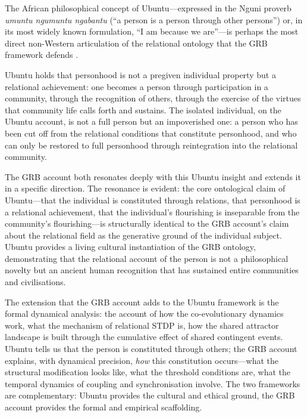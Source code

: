 \noindent
The African philosophical concept of Ubuntu---expressed in the Nguni proverb \emph{umuntu ngumuntu ngabantu} (``a person is a person through other persons'') or, in its most widely known formulation, ``I am because we are''---is perhaps the most direct non-Western articulation of the relational ontology that the GRB framework defends \parencite{mbiti1970,metz2011}.

Ubuntu holds that personhood is not a pregiven individual property but a relational achievement: one becomes a person through participation in a community, through the recognition of others, through the exercise of the virtues that community life calls forth and sustains. The isolated individual, on the Ubuntu account, is not a full person but an impoverished one: a person who has been cut off from the relational conditions that constitute personhood, and who can only be restored to full personhood through reintegration into the relational community.

The GRB account both resonates deeply with this Ubuntu insight and extends it in a specific direction. The resonance is evident: the core ontological claim of Ubuntu---that the individual is constituted through relations, that personhood is a relational achievement, that the individual's flourishing is inseparable from the community's flourishing---is structurally identical to the GRB account's claim about the relational field as the generative ground of the individual subject. Ubuntu provides a living cultural instantiation of the GRB ontology, demonstrating that the relational account of the person is not a philosophical novelty but an ancient human recognition that has sustained entire communities and civilisations.

The extension that the GRB account adds to the Ubuntu framework is the formal dynamical analysis: the account of how the co-evolutionary dynamics work, what the mechanism of relational STDP is, how the shared attractor landscape is built through the cumulative effect of shared contingent events. Ubuntu tells us that the person is constituted through others; the GRB account explains, with dynamical precision, \emph{how} this constitution occurs---what the structural modification looks like, what the threshold conditions are, what the temporal dynamics of coupling and synchronisation involve. The two frameworks are complementary: Ubuntu provides the cultural and ethical ground, the GRB account provides the formal and empirical scaffolding.

